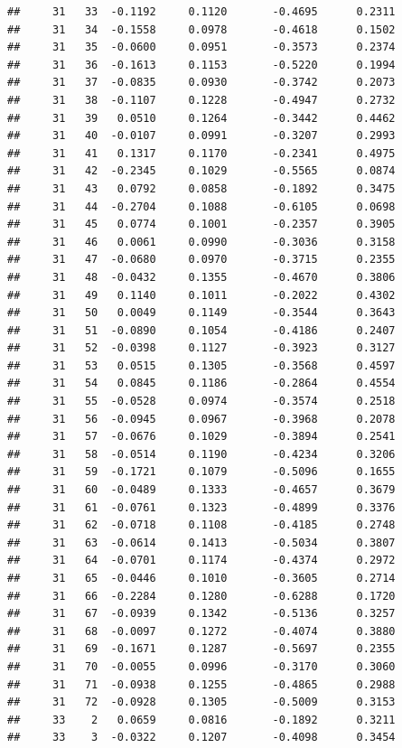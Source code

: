 \documentclass[
]{article}
\begin{document}
\begin{verbatim}
##     31   33  -0.1192     0.1120       -0.4695      0.2311 
##     31   34  -0.1558     0.0978       -0.4618      0.1502 
##     31   35  -0.0600     0.0951       -0.3573      0.2374 
##     31   36  -0.1613     0.1153       -0.5220      0.1994 
##     31   37  -0.0835     0.0930       -0.3742      0.2073 
##     31   38  -0.1107     0.1228       -0.4947      0.2732 
##     31   39   0.0510     0.1264       -0.3442      0.4462 
##     31   40  -0.0107     0.0991       -0.3207      0.2993 
##     31   41   0.1317     0.1170       -0.2341      0.4975 
##     31   42  -0.2345     0.1029       -0.5565      0.0874 
##     31   43   0.0792     0.0858       -0.1892      0.3475 
##     31   44  -0.2704     0.1088       -0.6105      0.0698 
##     31   45   0.0774     0.1001       -0.2357      0.3905 
##     31   46   0.0061     0.0990       -0.3036      0.3158 
##     31   47  -0.0680     0.0970       -0.3715      0.2355 
##     31   48  -0.0432     0.1355       -0.4670      0.3806 
##     31   49   0.1140     0.1011       -0.2022      0.4302 
##     31   50   0.0049     0.1149       -0.3544      0.3643 
##     31   51  -0.0890     0.1054       -0.4186      0.2407 
##     31   52  -0.0398     0.1127       -0.3923      0.3127 
##     31   53   0.0515     0.1305       -0.3568      0.4597 
##     31   54   0.0845     0.1186       -0.2864      0.4554 
##     31   55  -0.0528     0.0974       -0.3574      0.2518 
##     31   56  -0.0945     0.0967       -0.3968      0.2078 
##     31   57  -0.0676     0.1029       -0.3894      0.2541 
##     31   58  -0.0514     0.1190       -0.4234      0.3206 
##     31   59  -0.1721     0.1079       -0.5096      0.1655 
##     31   60  -0.0489     0.1333       -0.4657      0.3679 
##     31   61  -0.0761     0.1323       -0.4899      0.3376 
##     31   62  -0.0718     0.1108       -0.4185      0.2748 
##     31   63  -0.0614     0.1413       -0.5034      0.3807 
##     31   64  -0.0701     0.1174       -0.4374      0.2972 
##     31   65  -0.0446     0.1010       -0.3605      0.2714 
##     31   66  -0.2284     0.1280       -0.6288      0.1720 
##     31   67  -0.0939     0.1342       -0.5136      0.3257 
##     31   68  -0.0097     0.1272       -0.4074      0.3880 
##     31   69  -0.1671     0.1287       -0.5697      0.2355 
##     31   70  -0.0055     0.0996       -0.3170      0.3060 
##     31   71  -0.0938     0.1255       -0.4865      0.2988 
##     31   72  -0.0928     0.1305       -0.5009      0.3153 
##     33    2   0.0659     0.0816       -0.1892      0.3211 
##     33    3  -0.0322     0.1207       -0.4098      0.3454 

\end{verbatim}
\end{document}

